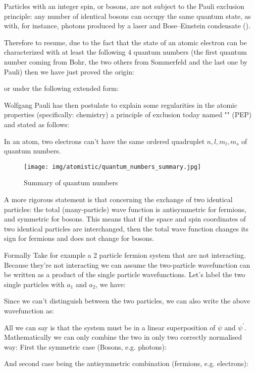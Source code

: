     Particles with an integer spin, or bosons, are not subject to the Pauli exclusion principle: any number of identical bosons can occupy the same quantum state, as with, for instance, photons produced by a laser and Bose–Einstein condensate ().
    
    Therefore to resume, due to the fact that the state of an atomic electron can be characterized with at least the following $4$ quantum numbers (the first quantum number coming from Bohr, the two others from Sommerfeld and the last one by Pauli) then we have just proved the origin:
	
	or under the following extended form:
	
	Wolfgang Pauli has then postulate to explain some regularities in the atomic properties (specifically: chemistry) a principle of exclusion today named "" (PEP) and stated as follows:

	In an atom, two electrons can't have the same ordered quadruplet $n,l,m_l,m_s$ of quantum numbers.
	\begin{figure}[H]
		\centering
		\texttt{[image: img/atomistic/quantum\_numbers\_summary.jpg]}
		\caption{Summary of quantum numbers}
	\end{figure}
	A more rigorous statement is that concerning the exchange of two identical particles: the total (many-particle) wave function is antisymmetric for fermions, and symmetric for bosons. This means that if the space and spin coordinates of two identical particles are interchanged, then the total wave function changes its sign for fermions and does not change for bosons.
	
	Formally Take for example a 2 particle fermion system that are not interacting. Because they're not interacting we can assume the two-particle wavefunction can be written as a product of the single particle wavefunctions. Let's label the two single particles with $a_{1}$ and $a_{2}$, we have:
	
	Since we can't distinguish between the two particles, we can also write the above wavefunction as:
	
	All we can say is that the system must be in a linear superposition of $\psi$ and $\psi^{\prime} .$ Mathematically we can only combine the two in only two correctly normalised way: First the symmetric case (Bosons, e.g. photons):
	
	And second case being the antisymmetric combination (fermions, e.g. electrons):
	
